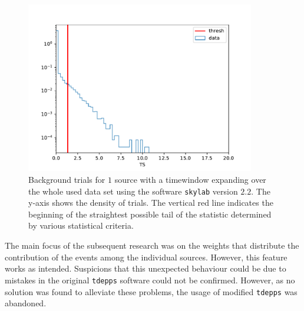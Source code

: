 \begin{figure}
    \centering
    \includegraphics[width=10cm]{Plots/06_tdepps/skylab_bg_pdf_one_source.pdf}
    \caption{Background trials for $\num{1}$ source with a timewindow expanding over the whole used data set using the software \texttt{skylab} version $\num{2.2}$. The y-axis shows the density of trials. The vertical red line indicates the beginning of the straightest possible tail of the statistic determined by various statistical criteria.}
    \label{fig:skylab}
\end{figure}

The main focus of the subsequent research was on the weights that distribute the contribution of the events among the individual sources.
However, this feature works as intended.
Suspicions that this unexpected behaviour could be due to mistakes in the original \texttt{tdepps} software could not be confirmed.
However, as no solution was found to alleviate these problems, the usage of modified \texttt{tdepps} was abandoned.
